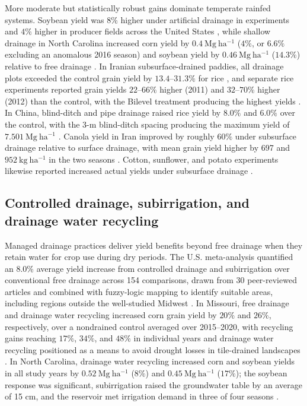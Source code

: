 \documentclass[11pt]{article}
\begin{document}
More moderate but statistically robust gains dominate temperate rainfed systems. Soybean yield was \(8\%\) higher under artificial drainage in experiments and \(4\%\) higher in producer fields across the United States \parencite{Mourtzinis2021}, while shallow drainage in North Carolina increased corn yield by \(0.4\ \mathrm{Mg\ ha^{-1}}\) (\(4\%\), or \(6.6\%\) excluding an anomalous 2016 season) and soybean yield by \(0.46\ \mathrm{Mg\ ha^{-1}}\) (\(14.3\%\)) relative to free drainage \parencite{Watkins2024}. In Iranian subsurface-drained paddies, all drainage plots exceeded the control grain yield by \(13.4\textrm{--}31.3\%\) for rice \parencite{DarziNaftchali2017b}, and separate rice experiments reported grain yields \(22\textrm{--}66\%\) higher (2011) and \(32\textrm{--}70\%\) higher (2012) than the control, with the Bilevel treatment producing the highest yields \parencite{DarziNaftchali2014}. In China, blind-ditch and pipe drainage raised rice yield by \(8.0\%\) and \(6.0\%\) over the control, with the 3-m blind-ditch spacing producing the maximum yield of \(7.501\ \mathrm{Mg\ ha^{-1}}\) \parencite{Qi2025b}. Canola yield in Iran improved by roughly \(60\%\) under subsurface drainage relative to surface drainage, with mean grain yield higher by 697 and \(952\ \mathrm{kg\ ha^{-1}}\) in the two seasons \parencite{Asgari2021}. Cotton, sunflower, and potato experiments likewise reported increased actual yields under subsurface drainage \parencite{Yang2022,Zhang2024c,SerranoCoronel2018}.

\subsection{Controlled drainage, subirrigation, and drainage water recycling}

Managed drainage practices deliver yield benefits beyond free drainage when they retain water for crop use during dry periods. The U.S. meta-analysis quantified an \(8.0\%\) average yield increase from controlled drainage and subirrigation over conventional free drainage across 154 comparisons, drawn from 30 peer-reviewed articles and combined with fuzzy-logic mapping to identify suitable areas, including regions outside the well-studied Midwest \parencite{Singh2022b}. In Missouri, free drainage and drainage water recycling increased corn grain yield by \(20\%\) and \(26\%\), respectively, over a nondrained control averaged over 2015--2020, with recycling gains reaching \(17\%\), \(34\%\), and \(48\%\) in individual years and drainage water recycling positioned as a means to avoid drought losses in tile-drained landscapes \parencite{Kaur2021}. In North Carolina, drainage water recycling increased corn and soybean yields in all study years by \(0.52\ \mathrm{Mg\ ha^{-1}}\) (\(8\%\)) and \(0.45\ \mathrm{Mg\ ha^{-1}}\) (\(17\%\)); the soybean response was significant, subirrigation raised the groundwater table by an average of 15 cm, and the reservoir met irrigation demand in three of four seasons \parencite{Moursi2024}.
\end{document}
